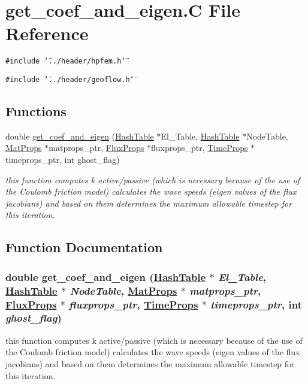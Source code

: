 \hypertarget{get__coef__and__eigen_8C}{
\section{get\_\-coef\_\-and\_\-eigen.C File Reference}
\label{get__coef__and__eigen_8C}
}
{\tt \#include \char`\"{}../header/hpfem.h\char`\"{}}\par
{\tt \#include \char`\"{}../header/geoflow.h\char`\"{}}\par
\subsection*{Functions}
\begin{CompactItemize}
\item 
double \hyperlink{get__coef__and__eigen_8C_a0}{get\_\-coef\_\-and\_\-eigen} (\hyperlink{classHashTable}{Hash\-Table} $\ast$El\_\-Table, \hyperlink{classHashTable}{Hash\-Table} $\ast$Node\-Table, \hyperlink{structMatProps}{Mat\-Props} $\ast$matprops\_\-ptr, \hyperlink{structFluxProps}{Flux\-Props} $\ast$fluxprops\_\-ptr, \hyperlink{structTimeProps}{Time\-Props} $\ast$timeprops\_\-ptr, int ghost\_\-flag)
\begin{CompactList}\small\item\em this function computes k active/passive (which is necessary because of the use of the Coulomb friction model) calculates the wave speeds (eigen values of the flux jacobians) and based on them determines the maximum allowable timestep for this iteration. \item\end{CompactList}\end{CompactItemize}


\subsection{Function Documentation}
\hypertarget{get__coef__and__eigen_8C_a0}{
\subsubsection[get\_\-coef\_\-and\_\-eigen]{\setlength{\rightskip}{0pt plus 5cm}double get\_\-coef\_\-and\_\-eigen (\hyperlink{classHashTable}{Hash\-Table} $\ast$ {\em El\_\-Table}, \hyperlink{classHashTable}{Hash\-Table} $\ast$ {\em Node\-Table}, \hyperlink{structMatProps}{Mat\-Props} $\ast$ {\em matprops\_\-ptr}, \hyperlink{structFluxProps}{Flux\-Props} $\ast$ {\em fluxprops\_\-ptr}, \hyperlink{structTimeProps}{Time\-Props} $\ast$ {\em timeprops\_\-ptr}, int {\em ghost\_\-flag})}}
\label{get__coef__and__eigen_8C_a0}


this function computes k active/passive (which is necessary because of the use of the Coulomb friction model) calculates the wave speeds (eigen values of the flux jacobians) and based on them determines the maximum allowable timestep for this iteration. 

